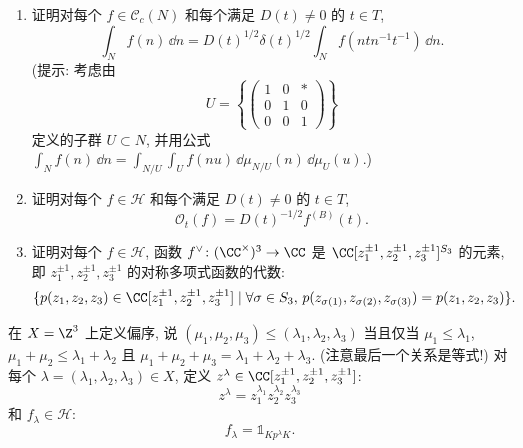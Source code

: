 \begin{enumerate}
\item[(12)] 证明对每个 $f \in \mathcal{C}_c(N)$ 和每个满足 $D(t) \neq 0$ 的 $t \in T$,
\[
\int_N f(n)\,\dd n = D(t)^{1/2}\delta(t)^{1/2}\int_N f(ntn^{-1}t^{-1})\,\dd n.
\]
(提示: 考虑由
\[
U = \left\{\begin{pmatrix} 1 & 0 & * \\ 0 & 1 & 0 \\ 0 & 0 & 1 \end{pmatrix}\right\}
\]
定义的子群 $U \subset N$, 并用公式 $\int_N f(n)\,\dd n = \int_{N/U}\int_U f(nu)\,\dd\mu_{N/U}(n)\,\dd\mu_U(u)$.)
\item[(13)] 证明对每个 $f \in \mathcal{H}$ 和每个满足 $D(t) \neq 0$ 的 $t \in T$,
\[
\mathcal{O}_t(f) = D(t)^{-1/2}f^{(B)}(t).
\]
\item[(14)] 证明对每个 $f \in \mathcal{H}$, 函数 $f^{\vee} \colon (\CC^{\times})^3 \to \CC$ 是 $\CC[z_1^{\pm 1}, z_2^{\pm 1}, z_3^{\pm 1}]^{S_3}$ 的元素, 即 $z_1^{\pm 1}, z_2^{\pm 1}, z_3^{\pm 1}$ 的对称多项式函数的代数:
\[
\{p(z_1, z_2, z_3) \in \CC[z_1^{\pm 1}, z_2^{\pm 1}, z_3^{\pm 1}] \mid \forall \sigma \in S_3,\, p(z_{\sigma(1)}, z_{\sigma(2)}, z_{\sigma(3)}) = p(z_1, z_2, z_3)\}.
\]
\end{enumerate}
在 $X = \Z^3$ 上定义偏序, 说 $(\mu_1, \mu_2, \mu_3) \leq (\lambda_1, \lambda_2, \lambda_3)$ 当且仅当 $\mu_1 \leq \lambda_1$, $\mu_1 + \mu_2 \leq \lambda_1 + \lambda_2$ 且 $\mu_1 + \mu_2 + \mu_3 = \lambda_1 + \lambda_2 + \lambda_3$. (注意最后一个关系是等式!) 对每个 $\lambda = (\lambda_1, \lambda_2, \lambda_3) \in X$, 定义 $z^{\lambda} \in \CC[z_1^{\pm 1}, z_2^{\pm 1}, z_3^{\pm 1}]$:
\[
z^{\lambda} = z_1^{\lambda_1}z_2^{\lambda_2}z_3^{\lambda_3}
\]
和 $f_{\lambda} \in \mathcal{H}$:
\[
f_{\lambda} = \mathbb{1}_{Kp^{\lambda}K}.
\]
